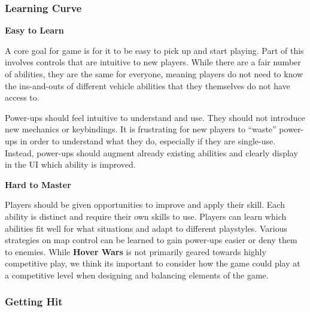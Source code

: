\documentclass{article}
\newcommand{\namenobold}{Hover Wars}
\newcommand{\name}{\textbf{\namenobold}}
\theoremstyle{definition}
\begin{document}
\subsubsection{Learning Curve}

\textbf{Easy to Learn}

A core goal for game is for it to be easy to pick up and start playing.
Part of this involves controls that are intuitive to new players. While there
are a fair number of abilities, they are the same for everyone, meaning players
do not need to know the ins-and-outs of different vehicle abilities that they
themselves do not have access to.

Power-ups should feel intuitive to understand and use. They should not
introduce new mechanics or keybindings. It is frustrating for new players to
``waste'' power-ups in order to understand what they do, especially if they are
single-use. Instead, power-ups should augment already existing abilities and
clearly display in the UI which ability is improved.

\textbf{Hard to Master}

Players should be given opportunities to improve and apply their skill. Each
ability is distinct and require their own skills to use. Players can learn
which abilities fit well for what situations and adapt to different playstyles.
Various strategies on map control can be learned to gain power-ups easier or
deny them to enemies. While \name{} is not primarily geared towards highly
competitive play, we think its important to consider how the game could play at
a competitive level when designing and balancing elements of the game.

\subsubsection{Getting Hit}
\end{document}
